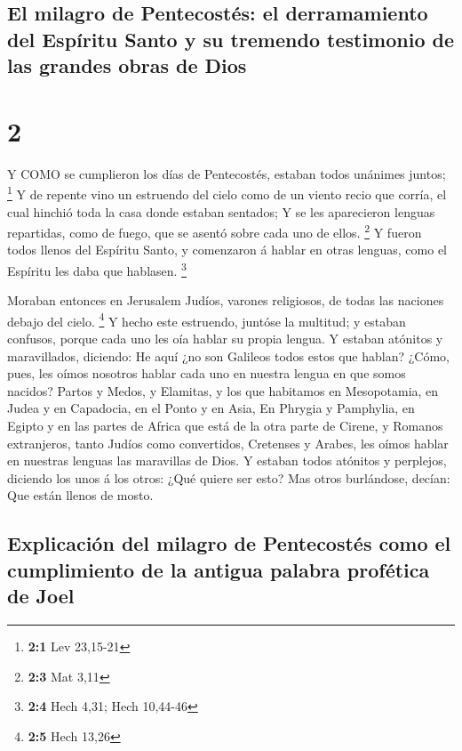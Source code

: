 \hypertarget{el-milagro-de-pentecostuxe9s-el-derramamiento-del-espuxedritu-santo-y-su-tremendo-testimonio-de-las-grandes-obras-de-dios}{%
\subsection{El milagro de Pentecostés: el derramamiento del Espíritu
Santo y su tremendo testimonio de las grandes obras de
Dios}\label{el-milagro-de-pentecostuxe9s-el-derramamiento-del-espuxedritu-santo-y-su-tremendo-testimonio-de-las-grandes-obras-de-dios}}

\hypertarget{section-1}{%
\section{2}\label{section-1}}

 Y COMO se cumplieron los días de Pentecostés, estaban todos
unánimes juntos; \footnote{\textbf{2:1} Lev 23,15-21}  Y de
repente vino un estruendo del cielo como de un viento recio que corría,
el cual hinchió toda la casa donde estaban sentados;  Y se
les aparecieron lenguas repartidas, como de fuego, que se asentó sobre
cada uno de ellos. \footnote{\textbf{2:3} Mat 3,11}  Y
fueron todos llenos del Espíritu Santo, y comenzaron á hablar en otras
lenguas, como el Espíritu les daba que hablasen. \footnote{\textbf{2:4}
  Hech 4,31; Hech 10,44-46}

 Moraban entonces en Jerusalem Judíos, varones religiosos,
de todas las naciones debajo del cielo. \footnote{\textbf{2:5} Hech
  13,26}  Y hecho este estruendo, juntóse la multitud; y
estaban confusos, porque cada uno les oía hablar su propia lengua.
 Y estaban atónitos y maravillados, diciendo: He aquí ¿no
son Galileos todos estos que hablan?  ¿Cómo, pues, les oímos
nosotros hablar cada uno en nuestra lengua en que somos nacidos?
 Partos y Medos, y Elamitas, y los que habitamos en
Mesopotamia, en Judea y en Capadocia, en el Ponto y en Asia,
 En Phrygia y Pamphylia, en Egipto y en las partes de
Africa que está de la otra parte de Cirene, y Romanos extranjeros, tanto
Judíos como convertidos,  Cretenses y Arabes, les oímos
hablar en nuestras lenguas las maravillas de Dios.  Y
estaban todos atónitos y perplejos, diciendo los unos á los otros: ¿Qué
quiere ser esto?  Mas otros burlándose, decían: Que están
llenos de mosto.

\hypertarget{explicaciuxf3n-del-milagro-de-pentecostuxe9s-como-el-cumplimiento-de-la-antigua-palabra-profuxe9tica-de-joel}{%
\subsection{Explicación del milagro de Pentecostés como el cumplimiento
de la antigua palabra profética de
Joel}\label{explicaciuxf3n-del-milagro-de-pentecostuxe9s-como-el-cumplimiento-de-la-antigua-palabra-profuxe9tica-de-joel}}

